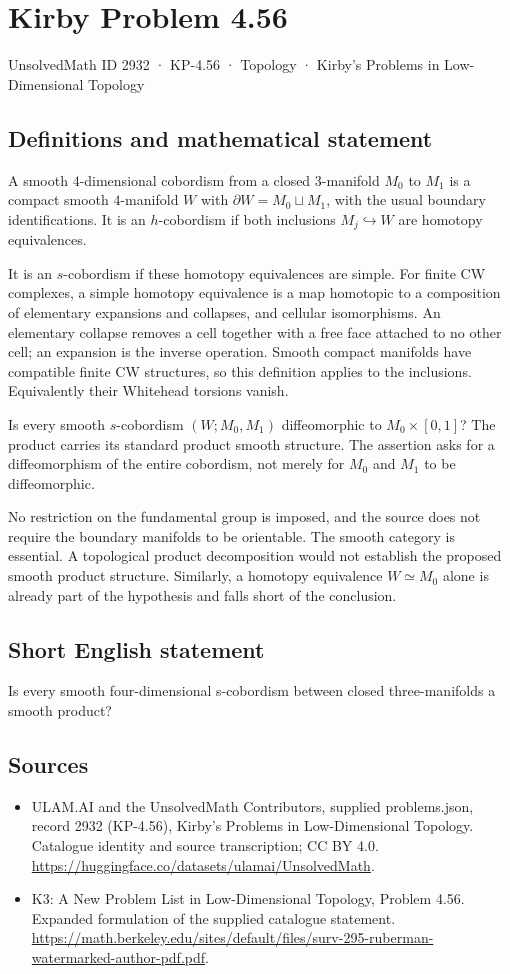 \documentclass[11pt,a4paper]{article}
\begin{document}
\section*{Kirby Problem 4.56}\label{2932}
{\small UnsolvedMath ID 2932 · KP-4.56 · Topology · Kirby's Problems in Low-Dimensional Topology}
\subsection{Definitions and mathematical statement}
A smooth $4$-dimensional cobordism from a closed $3$-manifold $M_0$
to $M_1$ is a compact smooth $4$-manifold $W$ with
$\partial W=M_0\sqcup M_1$, with the usual boundary identifications.
It is an $h$-cobordism if both inclusions $M_j\hookrightarrow W$
are homotopy equivalences.

It is an $s$-cobordism if these homotopy equivalences are simple.
For finite CW complexes, a simple homotopy equivalence is a map
homotopic to a composition of elementary expansions and collapses,
and cellular isomorphisms. An elementary collapse removes a cell
together with a free face attached to no other cell; an expansion
is the inverse operation. Smooth compact manifolds have compatible
finite CW structures, so this definition applies to the inclusions.
Equivalently their Whitehead torsions vanish.

Is every smooth $s$-cobordism $(W;M_0,M_1)$ diffeomorphic to
$M_0\times[0,1]$? The product carries its standard product smooth
structure. The assertion asks for a diffeomorphism of the entire
cobordism, not merely for $M_0$ and $M_1$ to be diffeomorphic.

No restriction on the fundamental group is imposed, and the source
does not require the boundary manifolds to be orientable. The
smooth category is essential. A topological product decomposition
would not establish the proposed smooth product structure. Similarly,
a homotopy equivalence $W\simeq M_0$ alone is already part of the
hypothesis and falls short of the conclusion.
\subsection{Short English statement}
Is every smooth four-dimensional s-cobordism between closed three-manifolds a smooth product?
\subsection{Sources}
\begin{itemize}
\item[S1] ULAM.AI and the UnsolvedMath Contributors, supplied problems.json, record 2932 (KP-4.56), Kirby's Problems in Low-Dimensional Topology. Catalogue identity and source transcription; CC BY 4.0.
\url{https://huggingface.co/datasets/ulamai/UnsolvedMath}.
\item[S2] K3: A New Problem List in Low-Dimensional Topology, Problem 4.56. Expanded formulation of the supplied catalogue statement.
\url{https://math.berkeley.edu/sites/default/files/surv-295-ruberman-watermarked-author-pdf.pdf}.
\end{itemize}
\end{document}
